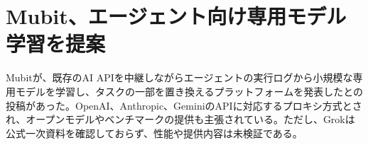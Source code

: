 \section{Mubit、エージェント向け専用モデル学習を提案}
Mubitが、既存のAI APIを中継しながらエージェントの実行ログから小規模な専用モデルを学習し、タスクの一部を置き換えるプラットフォームを発表したとの投稿があった。OpenAI、Anthropic、GeminiのAPIに対応するプロキシ方式とされ、オープンモデルやベンチマークの提供も主張されている。ただし、Grokは公式一次資料を確認しておらず、性能や提供内容は未検証である。
